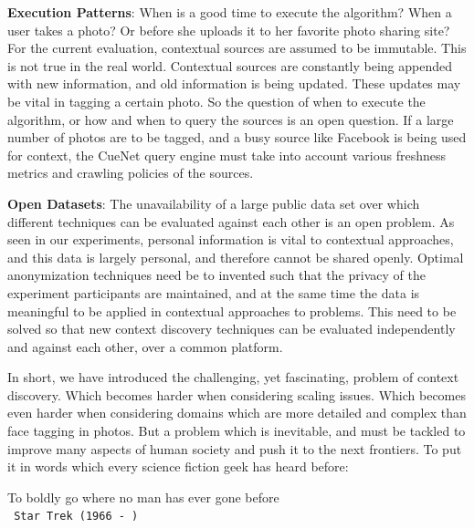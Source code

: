 \textbf{\textbf{Execution Patterns}}: When is a good time to execute the algorithm? When a user takes a photo? Or before she uploads it to her favorite photo sharing site? For the current evaluation, contextual sources are assumed to be immutable. This is not true in the real world. Contextual sources are constantly being appended with new information, and old information is being updated. These updates may be vital in tagging a certain photo. So the question of when to execute the algorithm, or how and when to query the sources is an open question. If a large number of photos are to be tagged, and a busy source like Facebook is being used for context, the CueNet query engine must take into account various freshness metrics and crawling policies of the sources. 

\textbf{\textbf{Open Datasets}}: The unavailability of a large public data set over which different techniques can be evaluated against each other is an open problem. As seen in our experiments, personal information is vital to contextual approaches, and this data is largely personal, and therefore cannot be shared openly. Optimal anonymization techniques need be to invented such that the privacy of the experiment participants are maintained, and at the same time the data is meaningful to be applied in contextual approaches to problems. This need to be solved so that new context discovery techniques can be evaluated independently and against each other, over a common platform.

In short, we have introduced the challenging, yet fascinating, problem of context discovery. Which becomes harder when considering scaling issues. Which becomes even harder when considering domains which are more detailed and complex than face tagging in photos. But a problem which is inevitable, and must be tackled to improve many aspects of human society and push it to the next frontiers. To put it in words which every science fiction geek has heard before:

\centering
To boldly go where no man has ever gone before \\
\setlength{\parindent}{8cm} \texttt{ Star Trek (1966 - ) } 